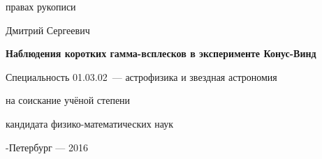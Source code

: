 \fontsize{14pt}{15pt}\selectfont  %
\thispagestyle{empty}

\vspace{10mm}
\begin{flushright}
   правах рукописи
  \textit{}
\end{flushright}

\vspace{30mm}
\begin{center}
{\Large{} Дмитрий Сергеевич}
\end{center}

\vspace{30mm}
\begin{center}
{\bf \LARGE Наблюдения коротких гамма-всплесков в эксперименте Конус-Винд
\par}

\vspace{30mm}
{\Large
Специальность 01.03.02~--- астрофизика и звездная астрономия
}

\vspace{15mm}
\par
{} на соискание учёной степени\par
кандидата физико-математических наук
\end{center}

\vspace{40mm}
\begin{center}
{-Петербург --- 2016}
\end{center}

\newpage

